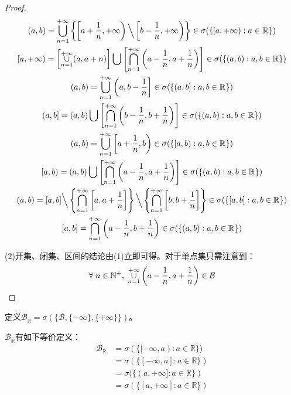 \begin{proof}
\begin{gather*}
		(a,b)=\underset{n=1}{\overset{+\infty}{\bigcup}}\left\{\left[a+\frac{1}{n},+\infty\right)\Big\backslash\left[b-\frac{1}{n},+\infty\right)\right\}\in\sigma(\{[a,+\infty):a\in\mathbb{R}^{}\}) \\
		[a,+\infty)=\left[\underset{n=1}{\overset{+\infty}{\cup}}(a,a+n)\right]\bigcup\left[\underset{n=1}{\overset{+\infty}{\bigcap}}\left(a-\frac{1}{n},a+\frac{1}{n}\right)\right]\in\sigma(\{(a,b):a,b\in\mathbb{R}^{}\}) \\
		(a,b)=\underset{n=1}{\overset{+\infty}{\bigcup}}\left(a,b-\frac{1}{n}\right]\in\sigma(\{(a,b]:a,b\in\mathbb{R}^{}\}) \\
		(a,b]=(a,b)\bigcup\left[\underset{n=1}{\overset{+\infty}{\bigcap}}\left(b-\frac{1}{n},b+\frac{1}{n}\right)\right]\in\sigma(\{(a,b):a,b\in\mathbb{R}^{}\}) \\
		(a,b)=\underset{n=1}{\overset{+\infty}{\bigcup}}\left[a+\frac{1}{n},b\right)\in\sigma(\{[a,b):a,b\in\mathbb{R}^{}\}) \\
		[a,b)=(a,b)\bigcup\left[\underset{n=1}{\overset{+\infty}{\bigcap}}\left(a-\frac{1}{n},a+\frac{1}{n}\right)\right]\in\sigma(\{(a,b):a,b\in\mathbb{R}^{}\}) \\
		(a,b)=[a,b]\Big\backslash\left\{\underset{n=1}{\overset{+\infty}{\bigcap}}\left[a,a+\frac{1}{n}\right]\right\}\Big\backslash\left\{\underset{n=1}{\overset{+\infty}{\bigcap}}\left[b,b+\frac{1}{n}\right]\right\}\in\sigma(\{[a,b]:a,b\in\mathbb{R}^{}\}) \\
		[a,b]=\underset{n=1}{\overset{+\infty}{\bigcap}}\left(a-\frac{1}{n},b+\frac{1}{n}\right)\in\sigma(\{(a,b):a,b\in\mathbb{R}^{}\})
	\end{gather*}\par
	(2)开集、闭集、区间的结论由(1)立即可得。对于单点集只需注意到：
	\begin{equation*}
		\forall\;n\in\mathbb{N}^+,\;\underset{n=1}{\overset{+\infty}{\cup}}\left(a-\frac{1}{n},a+\frac{1}{n}\right)\in\mathcal{B}\qedhere
	\end{equation*}
\end{proof}
\begin{definition}
	定义$\mathcal{B}_{\overline{\mathbb{R}}}=\sigma(\{\mathcal{B},\{-\infty\},\{+\infty\}\})$。
\end{definition}
\begin{theorem}\label{theo:BorelRwqEquivDef}
	$\mathcal{B}_{\overline{\mathbb{R}}}$有如下等价定义：
	\begin{align*}
		\mathcal{B}_{\overline{\mathbb{R}}}
		&=\sigma(\{[-\infty,a):a\in\mathbb{R}\}) \\
		&=\sigma(\{[-\infty,a]:a\in\mathbb{R}\}) \\
		&=\sigma(\{(a,+\infty]:a\in\mathbb{R}\}) \\
		&=\sigma(\{[a,+\infty]:a\in\mathbb{R}\})
	\end{align*}
\end{theorem}
